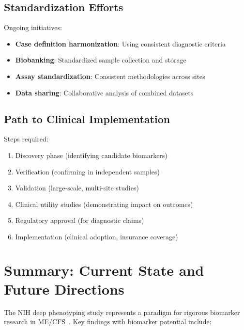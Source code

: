 \subsection{Standardization Efforts}

Ongoing initiatives:
\begin{itemize}
    \item \textbf{Case definition harmonization}: Using consistent diagnostic criteria
    \item \textbf{Biobanking}: Standardized sample collection and storage
    \item \textbf{Assay standardization}: Consistent methodologies across sites
    \item \textbf{Data sharing}: Collaborative analysis of combined datasets
\end{itemize}

\subsection{Path to Clinical Implementation}

Steps required:
\begin{enumerate}
    \item Discovery phase (identifying candidate biomarkers)
    \item Verification (confirming in independent samples)
    \item Validation (large-scale, multi-site studies)
    \item Clinical utility studies (demonstrating impact on outcomes)
    \item Regulatory approval (for diagnostic claims)
    \item Implementation (clinical adoption, insurance coverage)
\end{enumerate}

\section{Summary: Current State and Future Directions}
\label{sec:biomarker-summary}

The NIH deep phenotyping study represents a paradigm for rigorous biomarker research in ME/CFS~\cite{walitt2024deep}. Key findings with biomarker potential include:

